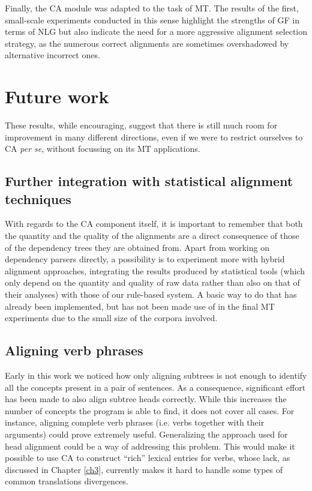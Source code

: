 Finally, the CA module was adapted to the task of MT. The results of the first, small-scale experiments conducted in this sense highlight the strengths of GF in terms of NLG but also indicate the need for a more aggressive alignment selection strategy, as the numerous correct alignments are sometimes overshadowed by alternative incorrect ones. 

\section*{Future work} \label{future}
These results, while encouraging, suggest that there is still much room for improvement in many different directions, even if we were to restrict ourselves to CA \textit{per se}, without focussing on its MT applications. 

\subsection*{Further integration with statistical alignment techniques} 
With regards to the CA component itself, it is important to remember that both the quantity and the quality of the alignments are a direct consequence of those of the dependency trees they are obtained from. 
Apart from working on dependency parsers directly, a possibility is to experiment more with hybrid alignment approaches, integrating the results produced by statistical tools (which only depend on the quantity and quality of raw data rather than also on that of their analyses) with those of our rule-based system. 
A basic way to do that has already been implemented, but has not been made use of in the final MT experiments due to the small size of the corpora involved.

\subsection*{Aligning verb phrases}
Early in this work we noticed how only aligning subtrees is not enough to identify all the concepts present in a pair of sentences. As a consequence, significant effort has been made to also align subtree heads correctly. While this increases the number of concepts the program is able to find, it does not cover all cases. For instance, aligning complete verb phrases (i.e. verbs together with their arguments) could prove extremely useful. Generalizing the approach used for head alignment could be a way of addressing this problem. 
This would make it possible to use CA to construct ``rich'' lexical entries for verbs, whose lack, as discussed in Chapter \ref{ch3}, currently makes it hard to handle some types of common translations divergences.

